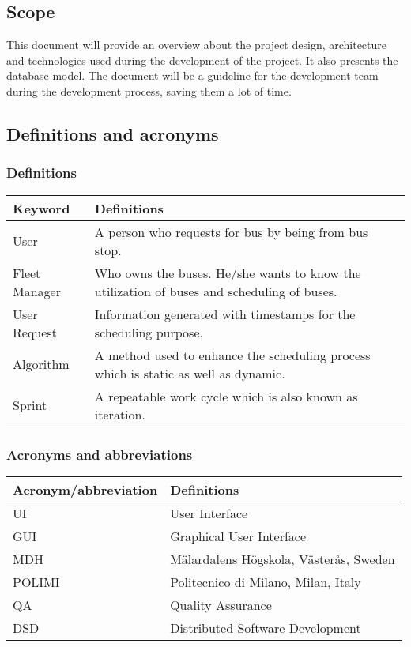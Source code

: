 \subsection{Scope} 
This document will provide an overview about the project design, architecture and technologies used during the development of the project. It also presents the database model.
The document will be a guideline for the development team during the development process, saving them a lot of time.  
\subsection{Definitions and acronyms}
\subsubsection{Definitions} 
\begin{center}
	\begin{tabular} { | m{3cm} | m{10cm} | }
		\hline
		\textbf{Keyword} & \textbf{Definitions}\\
		\hline
		User & A person who requests for bus by being from bus stop.\\
		\hline
		Fleet Manager & Who owns the buses. He/she wants to know the utilization of buses and scheduling of buses.\\
		\hline
		User Request & Information generated with timestamps for the scheduling purpose.\\
		\hline
		Algorithm & A method used to enhance the scheduling process which is static as well as dynamic.\\
		\hline
		Sprint & A repeatable work cycle which is also known as iteration.\\
		\hline
	\end{tabular}
\end{center}
\subsubsection{Acronyms and abbreviations}
\begin{center}
	\begin{tabular} { | m{5cm} | m{8cm} | }
		\hline
		\textbf{Acronym/abbreviation} & \textbf{Definitions}\\
		\hline
		UI & User Interface\\
		\hline
		GUI & Graphical User Interface\\
		\hline
		MDH & M\"{a}lardalens H\"{o}gskola, V\"{a}ster\r{a}s, Sweden\\
		\hline
		POLIMI & Politecnico di Milano, Milan, Italy\\
		\hline
		QA & Quality Assurance\\
		\hline
		DSD & Distributed Software Development\\
		\hline
	\end{tabular}
\end{center}